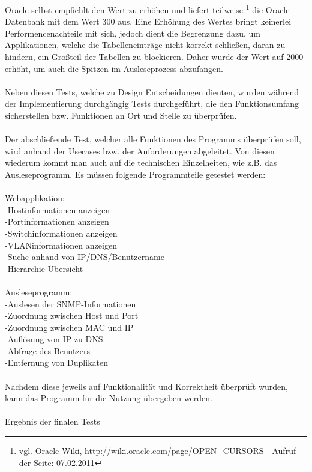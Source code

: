 Oracle selbst empfiehlt den Wert zu erhöhen und liefert teilweise \footnote{vgl. Oracle Wiki, http://wiki.oracle.com/page/OPEN\_CURSORS - Aufruf der Seite: 07.02.2011} die Oracle Datenbank mit dem Wert 300 aus. Eine Erhöhung des Wertes bringt keinerlei Performencenachteile mit sich, jedoch dient die Begrenzung dazu, um Applikationen, welche die Tabelleneinträge nicht korrekt schließen, daran zu hindern, ein Großteil der Tabellen zu blockieren. Daher wurde der Wert auf 2000 erhöht, um auch die Spitzen im Ausleseprozess abzufangen.\\\\
Neben diesen Tests, welche zu Design Entscheidungen dienten, wurden während der Implementierung durchgängig Tests durchgeführt, die den Funktionsumfang sicherstellen bzw. Funktionen an Ort und Stelle zu überprüfen.\\\\
Der abschließende Test, welcher alle Funktionen des Programms überprüfen soll, wird anhand der Usecases bzw. der Anforderungen abgeleitet. Von diesen wiederum kommt man auch auf die technischen Einzelheiten, wie z.B. das Ausleseprogramm.
Es müssen folgende Programmteile getestet werden:\\
\\
Webapplikation:\\
-Hostinformationen anzeigen\\
-Portinformationen anzeigen\\
-Switchinformationen anzeigen\\
-VLANinformationen anzeigen\\
-Suche anhand von IP/DNS/Benutzername\\
-Hierarchie Übersicht\\
\\
Ausleseprogramm:\\
-Auslesen der SNMP-Informationen\\
-Zuordnung zwischen Host und Port \\
-Zuordnung zwischen MAC und IP\\
-Auflösung von IP zu DNS\\
-Abfrage des Benutzers\\
-Entfernung von Duplikaten\\
\\
Nachdem diese jeweils auf Funktionalität und Korrektheit überprüft wurden, kann das Programm für die Nutzung übergeben werden.\\
\\
Ergebnis der finalen Tests\\
